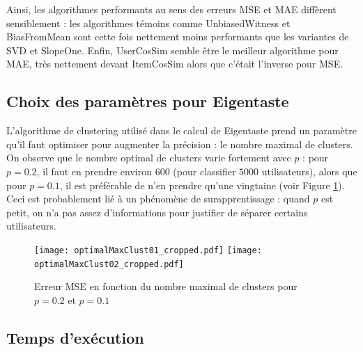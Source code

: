 \documentclass[11pt, openany, a4paper]{article}
\begin{document}
		Ainsi, les algorithmes performants au sens des erreurs MSE et MAE diffèrent sensiblement : les algorithmes témoins comme UnbiasedWitness et BiasFromMean sont cette fois nettement moins performants que les variantes de SVD et SlopeOne. Enfin, UserCosSim semble être le meilleur algorithme pour MAE, très nettement devant ItemCosSim alors que c'était l'inverse pour MSE. 
		
		
		
		
	\subsection{Choix des paramètres pour Eigentaste}
	
		L'algorithme de clustering utilisé dans le calcul de Eigentaste prend un paramètre qu'il faut optimiser pour augmenter la précision : le nombre maximal de clusters. On observe que le nombre optimal de clusters varie fortement avec $p$ : pour $p=0.2$, il faut en prendre environ $600$ (pour classifier $5000$ utilisateurs), alors que pour $p=0.1$, il est préférable de n'en prendre qu'une vingtaine (voir Figure \ref{clusterfig}). Ceci est probablement lié à un phénomène de surapprentissage : quand $p$ est petit, on n'a pas assez d'informations pour justifier de séparer certains utilisateurs.
		
		\begin{figure}[ht]
			\centering
			\texttt{[image: optimalMaxClust01\_cropped.pdf]}
			\texttt{[image: optimalMaxClust02\_cropped.pdf]}
			\caption{Erreur MSE en fonction du nombre maximal de clusters pour $p=0.2$ et $p=0.1$}
			\label{clusterfig}
		\end{figure}
		
	\subsection{Temps d'exécution}
	
\end{document}
